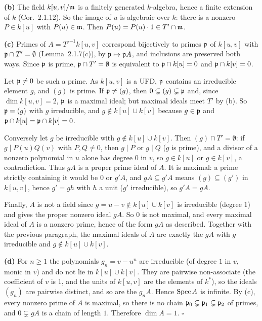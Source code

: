 \documentclass[11pt]{article}
\begin{document}
\textbf{(b)} The field $k[u,v]/\mathfrak m$ is a finitely generated $k$-algebra, hence a finite extension of $k$ (Cor.~2.1.12). So the image of $u$ is algebraic over $k$: there is a nonzero $P\in k[u]$ with $P(u)\in\mathfrak m$. Then $P(u)=P(u)\cdot1\in T'\cap\mathfrak m$.

\textbf{(c)} Primes of $A=T'^{-1}k[u,v]$ correspond bijectively to primes $\mathfrak p$ of $k[u,v]$ with $\mathfrak p\cap T'=\emptyset$ (Lemma~2.1.7(c)), by $\mathfrak p\mapsto\mathfrak p A$, and inclusions are preserved both ways. Since $\mathfrak p$ is prime, $\mathfrak p\cap T'=\emptyset$ is equivalent to $\mathfrak p\cap k[u]=0$ and $\mathfrak p\cap k[v]=0$.

Let $\mathfrak p\ne0$ be such a prime. As $k[u,v]$ is a UFD, $\mathfrak p$ contains an irreducible element $g$, and $(g)$ is prime. If $\mathfrak p\ne(g)$, then $0\subsetneq(g)\subsetneq\mathfrak p$ and, since $\dim k[u,v]=2$, $\mathfrak p$ is a maximal ideal; but maximal ideals meet $T'$ by (b). So $\mathfrak p=(g)$ with $g$ irreducible, and $g\notin k[u]\cup k[v]$ because $g\in\mathfrak p$ and $\mathfrak p\cap k[u]=\mathfrak p\cap k[v]=0$.

Conversely let $g$ be irreducible with $g\notin k[u]\cup k[v]$. Then $(g)\cap T'=\emptyset$: if $g\mid P(u)Q(v)$ with $P,Q\ne0$, then $g\mid P$ or $g\mid Q$ ($g$ is prime), and a divisor of a nonzero polynomial in $u$ alone has degree $0$ in $v$, so $g\in k[u]$ or $g\in k[v]$, a contradiction. Thus $gA$ is a proper prime ideal of $A$. It is maximal: a prime strictly containing it would be $0$ or $g'A$, and $gA\subseteq g'A$ means $(g)\subseteq(g')$ in $k[u,v]$, hence $g'=gh$ with $h$ a unit ($g'$ irreducible), so $g'A=gA$.

Finally, $A$ is not a field since $g=u-v\notin k[u]\cup k[v]$ is irreducible (degree $1$) and gives the proper nonzero ideal $gA$. So $0$ is not maximal, and every maximal ideal of $A$ is a nonzero prime, hence of the form $gA$ as described. Together with the previous paragraph, the maximal ideals of $A$ are exactly the $gA$ with $g$ irreducible and $g\notin k[u]\cup k[v]$.

\textbf{(d)} For $n\ge1$ the polynomials $g_n=v-u^n$ are irreducible (of degree $1$ in $v$, monic in $v$) and do not lie in $k[u]\cup k[v]$. They are pairwise non-associate (the coefficient of $v$ is $1$, and the units of $k[u,v]$ are the elements of $k^*$), so the ideals $(g_n)$ are pairwise distinct, and so are the $g_nA$. Hence $\operatorname{Spec} A$ is infinite. By (c), every nonzero prime of $A$ is maximal, so there is no chain $\mathfrak p_0\subsetneq\mathfrak p_1\subsetneq\mathfrak p_2$ of primes, and $0\subsetneq gA$ is a chain of length $1$. Therefore $\dim A=1$. \hfill$\square$
\end{document}
